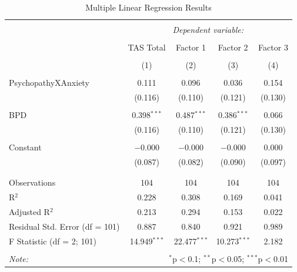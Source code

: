 \documentclass[
  man,floatsintext]{apa7}
\begin{document}
\begin{table}[!htbp] \centering 
  \caption{Multiple Linear Regression Results} 
  \label{tab:mult-regression-output} 
\begin{tabular}{@{\extracolsep{1pt}}lcccc} 
\\[-1.8ex]\hline 
\hline \\[-1.8ex] 
 & \multicolumn{4}{c}{\textit{Dependent variable:}} \\ 
\cline{2-5} 
\\[-1.8ex] & TAS Total & Factor 1 & Factor 2 & Factor 3 \\ 
\\[-1.8ex] & (1) & (2) & (3) & (4)\\ 
\hline \\[-1.8ex] 
 PsychopathyXAnxiety & 0.111 & 0.096 & 0.036 & 0.154 \\ 
  & (0.116) & (0.110) & (0.121) & (0.130) \\ 
  & & & & \\ 
 BPD & 0.398$^{***}$ & 0.487$^{***}$ & 0.386$^{***}$ & 0.066 \\ 
  & (0.116) & (0.110) & (0.121) & (0.130) \\ 
  & & & & \\ 
 Constant & $-$0.000 & $-$0.000 & $-$0.000 & 0.000 \\ 
  & (0.087) & (0.082) & (0.090) & (0.097) \\ 
  & & & & \\ 
\hline \\[-1.8ex] 
Observations & 104 & 104 & 104 & 104 \\ 
R$^{2}$ & 0.228 & 0.308 & 0.169 & 0.041 \\ 
Adjusted R$^{2}$ & 0.213 & 0.294 & 0.153 & 0.022 \\ 
Residual Std. Error (df = 101) & 0.887 & 0.840 & 0.921 & 0.989 \\ 
F Statistic (df = 2; 101) & 14.949$^{***}$ & 22.477$^{***}$ & 10.273$^{***}$ & 2.182 \\ 
\hline 
\hline \\[-1.8ex] 
\textit{Note:}  & \multicolumn{4}{r}{$^{*}$p$<$0.1; $^{**}$p$<$0.05; $^{***}$p$<$0.01} \\ 
\end{tabular} 
\end{table}
\end{document}
